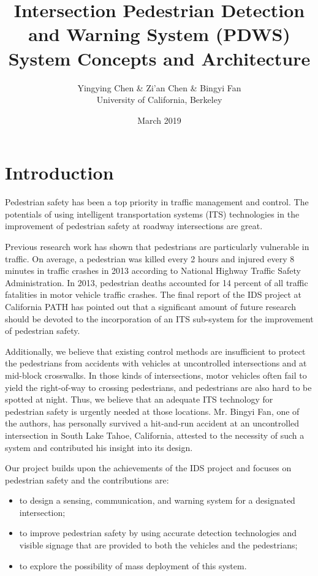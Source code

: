 \documentclass{article}
\title{Intersection Pedestrian Detection and Warning System (PDWS) \\ System Concepts and Architecture}
\author{Yingying Chen & Zi'an Chen & Bingyi Fan \\ University of California, Berkeley}
\date{March 2019}
\begin{document}
\maketitle
\newpage
\tableofcontents
\listoffigures
\newpage
\section{Introduction}
Pedestrian safety has been a top priority in traffic management and control. The potentials of using intelligent transportation systems (ITS) technologies in the improvement of pedestrian safety at roadway intersections are great. 

Previous research work has shown that pedestrians are particularly vulnerable in traffic. On average, a pedestrian was killed every 2 hours and injured every 8 minutes in traffic crashes in 2013 according to National Highway Traffic Safety Administration. In 2013, pedestrian deaths accounted for 14 percent of all traffic fatalities in motor vehicle traffic crashes. 
The final report of the IDS project at California PATH has pointed out that a significant amount of future research should be devoted to the incorporation of an ITS sub-system for the improvement of pedestrian safety.

Additionally, we believe that existing control methods are insufficient to protect the pedestrians from accidents with vehicles at uncontrolled intersections and at mid-block crosswalks. In those kinds of intersections, motor vehicles often fail to yield the right-of-way to crossing pedestrians, and pedestrians are also hard to be spotted at night. Thus, we believe that an adequate ITS technology for pedestrian safety is urgently needed at those locations. Mr. Bingyi Fan, one of the authors, has personally survived a hit-and-run accident at an uncontrolled intersection in South Lake Tahoe, California, attested to the necessity of such a system and contributed his insight into its design.

Our project builds upon the achievements of the IDS project and focuses on pedestrian safety and the contributions are:
\begin{itemize}
    \item to design a sensing, communication, and warning system for a designated intersection;
    \item to improve pedestrian safety by using accurate detection technologies and visible signage that are provided to both the vehicles and the pedestrians;
    \item to explore the possibility of mass deployment of this system.
\end{itemize}
\end{document}

